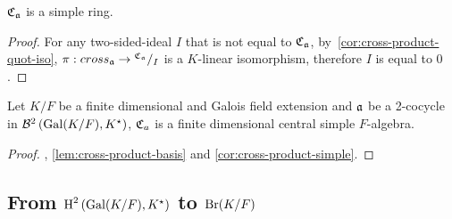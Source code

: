\begin{corollary}\label{cor:cross-product-simple}
  $\operatorname{\mathfrak{C}}_{\mathfrak{a}}$ is a simple ring.
  \leanok
\end{corollary}

\begin{proof}
  For any two-sided-ideal $I$ that is not equal to $\operatorname{\mathfrak{C}}_{\mathfrak{a}}$, by~\cref{cor:cross-product-quot-iso}, $\pi : cross_{\mathfrak{a}} \to {}^{\operatorname{\mathfrak{C}}_{\mathfrak{a}}}/_{I}$ is a $K$-linear isomorphism, therefore $I$ is equal to $0$.
\end{proof}

\begin{theorem}\label{thm:cross-product-csa}
  Let $K/F$ be a finite dimensional and Galois field extension and $\mathfrak{a}$ be a 2-cocycle in $\mathcal{B}^{2}\left(\operatorname{Gal}(K/F), K^{\star}\right)$, $\operatorname{\mathfrak{C}}_{a}$ is a finite dimensional central simple $F$-algebra.
  \leanok
\end{theorem}
\begin{proof}
  , \cref{lem:cross-product-basis} and \cref{cor:cross-product-simple}.
\end{proof}

\subsection{From $\operatorname{H}^{2}\left(\operatorname{Gal}(K/F), K^{\star}\right)$ to $\operatorname{Br}(K/F)$}



